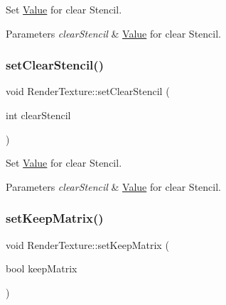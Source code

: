 Set \hyperlink{classValue}{Value} for clear Stencil.


\begin{DoxyParams}{Parameters}
{\em clear\+Stencil} & \hyperlink{classValue}{Value} for clear Stencil. \\
\hline
\end{DoxyParams}
\mbox{\label{classRenderTexture_a56dca402afad6762c5fe3c91dae32d8b}} 
\subsubsection{\texorpdfstring{set\+Clear\+Stencil()}{setClearStencil()}\hspace{0.1cm}{\footnotesize\ttfamily [2/2]}}
{\footnotesize\ttfamily void Render\+Texture\+::set\+Clear\+Stencil (\begin{DoxyParamCaption}\item[{int}]{clear\+Stencil }\end{DoxyParamCaption})\hspace{0.3cm}{\ttfamily [inline]}}

Set \hyperlink{classValue}{Value} for clear Stencil.


\begin{DoxyParams}{Parameters}
{\em clear\+Stencil} & \hyperlink{classValue}{Value} for clear Stencil. \\
\hline
\end{DoxyParams}
\mbox{\label{classRenderTexture_a9cfc0e640f5e3ddf666bd3b7b735991a}} 
\subsubsection{\texorpdfstring{set\+Keep\+Matrix()}{setKeepMatrix()}\hspace{0.1cm}{\footnotesize\ttfamily [1/2]}}
{\footnotesize\ttfamily void Render\+Texture\+::set\+Keep\+Matrix (\begin{DoxyParamCaption}\item[{bool}]{keep\+Matrix }\end{DoxyParamCaption})}

